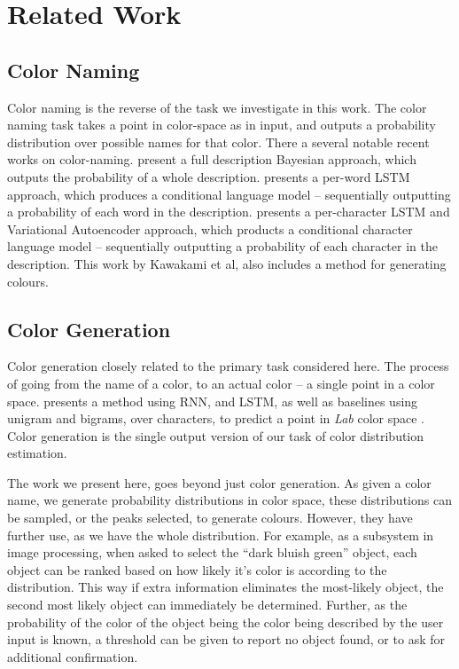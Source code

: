 \documentclass[11pt,letterpaper]{article}
\begin{document}
 
\section{Related Work}

\subsection{Color Naming}
Color naming is the reverse of the task we investigate in this work.
The color naming task takes a point in color-space as in input, and outputs a probability distribution over possible names for that color.
There a several notable recent works on color-naming.
\cite{mcmahan2015bayesian,meomcmahanstone:color} present a full description Bayesian approach, which outputs the probability of a whole description.
\cite{2016arXiv160603821M} presents a per-word LSTM approach, which produces a conditional language model -- sequentially outputting a probability of each word in the description.
\cite{DBLP:journals/corr/KawakamiDRS16} presents a per-character LSTM and Variational Autoencoder approach, which products a conditional character language model -- sequentially outputting a probability of each character in the description.
This work by Kawakami et al, also includes a method for generating colours.

\subsection{Color Generation}
Color generation closely related to the primary task considered here.
The process of going from the name of a color, to an actual color -- a single point in a color space.
\cite{DBLP:journals/corr/KawakamiDRS16} presents a method using RNN, and LSTM, as well as baselines using unigram and bigrams, over characters, to predict a point in \emph{Lab} color space \cite{hunter1958photoelectric}.
Color generation is the single output version of our task of color distribution estimation.

The work we present here, goes beyond just color generation.
As given a color name, we generate probability distributions in color space,
these distributions can be sampled, or the peaks selected, to generate colours.
However, they have further use, as we have the whole distribution.
For example, as a subsystem in image processing, when asked to select the ``dark bluish green'' object, each object can be ranked based on how likely it's color is according to the distribution.
This way if extra information eliminates the most-likely object, the second most likely object can immediately be determined.
Further, as the probability of the color of the object being the color being described by the user input is known, a threshold can be given to report no object found, or to ask for additional confirmation.
\end{document}
